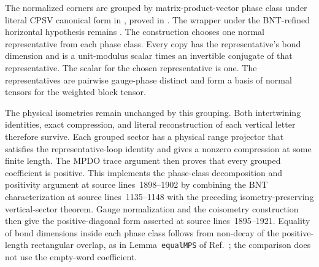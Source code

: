 \documentclass{article}
\begin{document}
The normalized corners are grouped by matrix-product-vector phase class under
literal CPSV canonical form in
,
proved in . The wrapper under the
BNT-refined horizontal hypothesis remains
.
The construction chooses one normal representative from each phase class.
Every copy has the representative's bond dimension and is a unit-modulus
scalar times an invertible conjugate of that representative. The scalar for
the chosen representative is one. The representatives are pairwise
gauge-phase distinct and form a basis of normal tensors for the weighted block
tensor.

The physical isometries remain unchanged by this grouping. Both intertwining
identities, exact compression, and literal reconstruction of each vertical
letter therefore survive. Each grouped sector has a physical range projector
that satisfies the representative-loop identity and gives a nonzero
compression at some finite length. The MPDO trace argument then proves that
every grouped coefficient is positive. This implements the phase-class
decomposition and positivity argument at source lines~1898--1902 by combining
the BNT characterization at source lines~1135--1148 with the preceding
isometry-preserving vertical-sector theorem. Gauge normalization and the
coisometry construction then give the positive-diagonal form asserted at
source lines~1895--1921. Equality of bond dimensions inside each phase class
follows from non-decay of the positive-length rectangular overlap, as in
Lemma~\texttt{equalMPS} of Ref.~\cite{Cirac2016MPDO_arXiv}; the comparison
does not use the empty-word coefficient.
\end{document}

